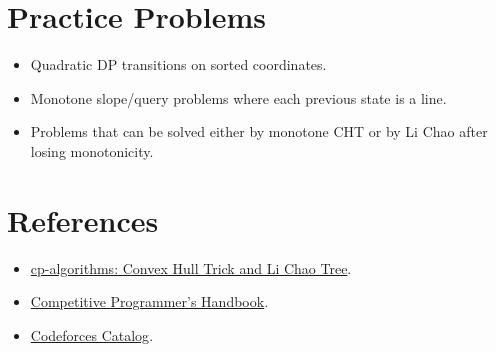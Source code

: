 \section*{Practice Problems}

\begin{itemize}
  \item Quadratic DP transitions on sorted coordinates.
  \item Monotone slope/query problems where each previous state is a line.
  \item Problems that can be solved either by monotone CHT or by Li Chao after losing monotonicity.
\end{itemize}

\section*{References}

\begin{itemize}
  \item \href{https://cp-algorithms.com/geometry/convex_hull_trick.html}{cp-algorithms: Convex Hull Trick and Li Chao Tree}.
  \item \href{https://usaco.guide/CPH.pdf}{Competitive Programmer's Handbook}.
  \item \href{https://codeforces.com/catalog}{Codeforces Catalog}.
\end{itemize}
